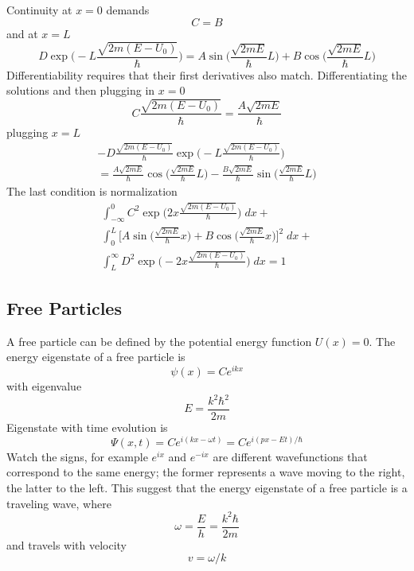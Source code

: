 \documentclass[../../main.tex]{subfiles}
\begin{document}
Continuity at $x=0$ demands
\begin{equation*}
    C=B
\end{equation*}
and at $x=L$
\begin{equation*}
    D\exp\biggl( -L{\frac{\sqrt{2m(E-U_0)}}{\hbar}} \biggr)=A\sin \biggl(\frac{\sqrt{2mE}}{\hbar} L\biggr)+ B \cos \biggl(\frac{\sqrt{2mE}}{\hbar} L\biggr)
\end{equation*}
Differentiability requires that their first derivatives also match. Differentiating the solutions and then plugging in $x=0$
\begin{equation*}
    C\frac{\sqrt{2m(E-U_0)}}{\hbar}=\frac{A\sqrt{2mE}}{\hbar}
\end{equation*}
plugging $x=L$
\begin{multline*}
    -D{\frac{\sqrt{2m(E-U_0)}}{\hbar}}\exp\biggl( -L{\frac{\sqrt{2m(E-U_0)}}{\hbar}} \biggr)\\=  \frac{A\sqrt{2mE}}{\hbar} \cos \biggl(\frac{\sqrt{2mE}}{\hbar} L\biggr)-\frac{B\sqrt{2mE}}{\hbar} \sin \biggl(\frac{\sqrt{2mE}}{\hbar} L\biggr)
\end{multline*}
The last condition is normalization
\begin{multline*}
    \int_{-\infty}^{0}C^2\exp\biggl( 2x{\frac{\sqrt{2m(E-U_0)}}{\hbar}} \biggr)\;dx+\\ \int_{0}^{L}\biggl[ A\sin \biggl(\frac{\sqrt{2mE}}{\hbar} x\biggr)+ B \cos \biggl(\frac{\sqrt{2mE}}{\hbar} x\biggr) \biggr]^2\;dx + \\ \int_{L}^{\infty} D^2\exp\biggl( -2x{\frac{\sqrt{2m(E-U_0)}}{\hbar}} \biggr)\;dx=1
\end{multline*}

\subsection{Free Particles}
A free particle can be defined by the potential energy function $U(x) = 0$. The energy eigenstate of a free particle is
\begin{equation*}
    \psi(x) = Ce^{ikx}
\end{equation*}
with eigenvalue
\begin{equation*}
    E=\frac{k^2\hbar^2}{2m}
\end{equation*}
Eigenstate with time evolution is
\begin{equation*}
    \Psi(x,t)=Ce^{i(kx-\omega t)} = Ce^{i(px-Et)/\hbar}
\end{equation*}
Watch the signs, for example $e^{ix}$ and $e^{-ix}$ are different wavefunctions that correspond to the same energy; the former represents a wave moving to the right, the latter to the left. This suggest that the energy eigenstate of a free particle is a traveling wave, where
\begin{equation*}
    \omega=\frac{E}{h}=\frac{k^2\hbar}{2m}
\end{equation*} 
and travels with velocity \begin{equation*}
    v=\omega/k
\end{equation*}
\end{document}
